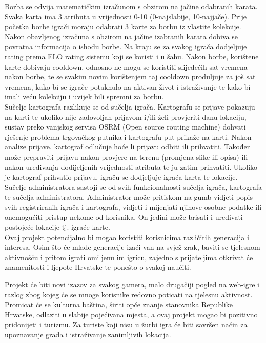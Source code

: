 		\textnormal{Borba se odvija matematičkim izračunom s obzirom na jačine odabranih karata. Svaka karta ima 3 atributa u vrijednosti 0-10 (0-najslabije, 10-najjače). Prije početka borbe igrači moraju odabrati 3 karte za borbu iz vlastite kolekcije. Nakon obavljenog izračuna s obzirom na jačine izabranih karata dobiva se povratna informacija o ishodu borbe. Na kraju se za svakog igrača dodjeljuje rating prema ELO rating sistemu koji se koristi i u šahu.}
		\textnormal{Nakon borbe, korištene karte dobivaju cooldown, odnosno ne mogu se koristiti slijedećih sat vremena nakon borbe, te se svakim novim korištenjem taj cooldown produljuje za još sat vremena, kako bi se igrače potaknulo na aktivan život i istraživanje te kako bi imali veću kolekciju i uvijek bili spremni za borbu.}\\
		
		\textnormal{Sučelje kartografa razlikuje se od sučelja igrača. Kartografu se prijave pokazuju na karti te ukoliko nije zadovoljan prijavom i/ili želi provjeriti danu lokaciju, sustav preko vanjskog servisa OSRM (Open source routing machine) dohvati rješenje problema trgovačkog putnika i kartografu put prikaže na karti. Nakon analize prijave, kartograf odlučuje hoće li prijavu odbiti ili prihvatiti. Također može prepraviti prijavu nakon provjere na terenu (promjena slike ili opisa) ili nakon uređivanja dodijeljenih vrijednosti atributa te ju zatim prihvatiti. Ukoliko je kartograf prihvatio prijavu, igraču se dodjeljuje igraća karta te lokacije.}\\
		
		\textnormal{Sučelje administratora sastoji se od svih funkcionalnosti sučelja igrača, kartografa te sučelja administratora. Administrator može pritiskom na gumb vidjeti popis svih registriranih igrača i kartografa, vidjeti i mijenjati njihove osobne podatke ili onemogućiti pristup nekome od korisnika. On jedini može brisati i uređivati postojeće lokacije tj. igraće karte.}\\
		
		
		\textnormal{Ovaj projekt potencijalno bi mogao koristiti korisnicima različitih generacija i interesa. Osim što će mlađe generacije izaći van na svjež zrak, baviti se tjelesnom aktivnošću i pritom igrati omiljenu im igricu, zajedno s prijateljima otkrivat će znamenitosti i ljepote Hrvatske te ponešto o svakoj naučiti.}
		
		\textnormal{Projekt će biti novi izazov za svakog gamera, malo drugačiji pogled na web-igre i razlog zbog kojeg će se mnoge korisnike redovno poticati na tjelesnu aktivnost. Promicat će se kulturna baština, širiti opće znanje stanovnika Republike Hrvatske, odlaziti u slabije pojećivana mjesta, a ovaj projekt mogao bi pozitivno pridonijeti i turizmu. Za turiste koji nisu u žurbi igra će biti savršen način za upoznavanje grada i istraživanje zanimljivih lokacija.}\\
		
